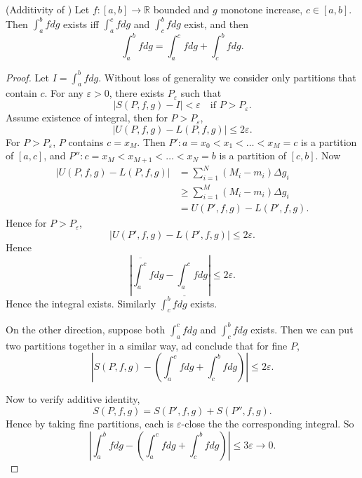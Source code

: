 \begin{proposition}(Additivity of )
	Let $f: [a,b] \to \mathbb{R}$ bounded and $g$ monotone increase, $c \in [a,b]$. Then $\int _a^b fdg $ exists iff  $\int _a^c fdg $ and $\int _c^b fdg $ exist, and then
	\[
		\int _a^b fdg = \int _a^c fdg+ \int _c^b fdg
	.\] 
	
\end{proposition}
\begin{proof}
	Let $I = \int _a^b fdg $. Without loss of generality we consider only partitions that contain $c$. For any $\varepsilon>0$, there exists $P_\varepsilon$ such that 
	\[
		\left| S(P, f, g)- I \right| <\varepsilon \quad \text{if }P > P_\varepsilon
	.\] 
	Assume existence of integral, then for $P > P_\varepsilon$,
	\[
		\left| U(P, f, g)- L(P, f, g) \right| \le  2\varepsilon
	.\] 
	For $P>P_\varepsilon$, $P$ contains $c = x_M$. Then $P': a = x_0 < x_1 < \ldots < x_M = c$ is a partition of $[a,c]$, and $P'': c = x_M < x_{M+1} < \ldots<x_N = b$ is a partition of $[c,b]$. Now
	\begin{align*}
		\left| U(P, f, g)- L(P, f, g) \right| &= \sum_{i=1}^{N} (M_i - m_i) \Delta g_i\\
		&\ge \sum_{i=1}^{M} (M_i - m_i) \Delta g_i \\
		&= U(P', f, g) - L(P', f, g)
	.\end{align*} 
	Hence for $P > P_\varepsilon$, \[
		\left| U(P', f, g)- L(P', f, g) \right| \le  2\varepsilon
	.\]
	Hence \[
		\left| \overline{\int _a^c} fdg - \underline{\int _a^c} fdg  \right| \le  2 \varepsilon
	.\] 
	Hence the integral exists. Similarly $\int _c^b f dg$ exists.

	On the other direction, suppose both $\int _a^c f dg$ and $\int _c^b f dg$ exists. Then we can put two partitions together in a similar way, ad conclude that for fine $P$,
	\[
		\left| S(P, f, g) - \left( \int_a^c f dg + \int _c^b f dg \right)  \right| \le 2 \varepsilon
	.\] 

	Now to verify additive identity,
	\[
		S(P, f, g) = S(P', f, g) + S(P'', f, g)
	.\] 
	Hence by taking fine partitions, each is $\varepsilon$-close the the corresponding integral. So 
\[
		\left| \int _a^b fdg  - \left(\int _a^c fdg+ \int _c^b fdg\right) \right| \le 3 \varepsilon \to 0
.\] 
\end{proof}


